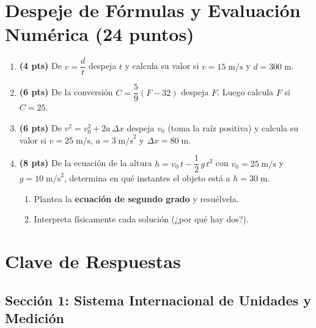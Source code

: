 \documentclass[12pt, letterpaper]{article}
\begin{document}
\newpage

\section{Despeje de Fórmulas y Evaluación Numérica (24 puntos)}

\begin{enumerate}[leftmargin=*]
  \item \textbf{(4 pts)} De $v = \dfrac{d}{t}$ despeja $t$ y calcula su valor si $v = 15\;\text{m/s}$ y $d = 300\;\text{m}$.

  \item \textbf{(6 pts)} De la conversión $C = \dfrac{5}{9}(F - 32)$ despeja $F$. Luego calcula $F$ si $C = 25$.

  \item \textbf{(6 pts)} De $v^2 = v_0^2 + 2a\,\Delta x$ despeja $v_0$ (toma la raíz positiva) y calcula su valor si $v = 25\;\text{m/s}$, $a = 3\;\text{m/s}^2$ y $\Delta x = 80\;\text{m}$.

  \item \textbf{(8 pts)} De la ecuación de la altura $h = v_0\,t - \dfrac{1}{2}\,g\,t^2$ con $v_0 = 25\;\text{m/s}$ y $g = 10\;\text{m/s}^2$, determina en qué instantes el objeto está a $h = 30\;\text{m}$.
        \begin{enumerate}[label=\alph*)]
          \item Plantea la \textbf{ecuación de segundo grado} y resuélvela.
          \item Interpreta físicamente cada solución (¿por qué hay dos?).
        \end{enumerate}
\end{enumerate}

\newpage

\ifmwclaves
  \section{Clave de Respuestas}

  \subsection*{Sección 1: Sistema Internacional de Unidades y Medición}
\end{document}

